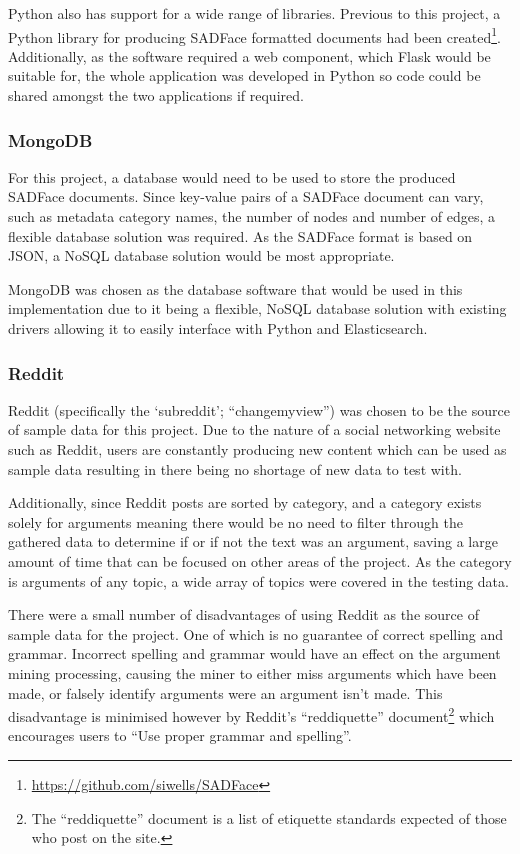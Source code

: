 \documentclass[12pt,a4paper]{article}
\begin{document}
Python also has support for a wide range of libraries. Previous to this project, a Python library for producing SADFace formatted documents had been created\footnote{\url{https://github.com/siwells/SADFace}}. Additionally, as the software required a web component, which Flask would be suitable for, the whole application was developed in Python so code could be shared amongst the two applications if required.

\subsubsection{MongoDB}

For this project, a database would need to be used to store the produced SADFace documents. Since key-value pairs of a SADFace document can vary, such as metadata category names, the number of nodes and number of edges, a flexible database solution was required. As the SADFace format is based on JSON, a NoSQL database solution would be most appropriate. 

MongoDB was chosen as the database software that would be used in this implementation due to it being a flexible, NoSQL database solution with existing drivers allowing it to easily interface with Python and Elasticsearch.

\subsubsection{Reddit}

Reddit (specifically the `subreddit'; ``changemyview'') was chosen to be the source of sample data for this project. Due to the nature of a social networking website such as Reddit, users are constantly producing new content which can be used as sample data resulting in there being no shortage of new data to test with.

Additionally, since Reddit posts are sorted by category, and a category exists solely for arguments meaning there would be no need to filter through the gathered data to determine if or if not the text was an argument, saving a large amount of time that can be focused on other areas of the project. As the category is arguments of any topic, a wide array of topics were covered in the testing data.

There were a small number of disadvantages of using Reddit as the source of sample data for the project. One of which is no guarantee of correct spelling and grammar.  Incorrect spelling and grammar would have an effect on the argument mining processing, causing the miner to either miss arguments which have been made, or falsely identify arguments were an argument isn't made. This disadvantage is minimised however by Reddit's ``reddiquette'' document\footnote{The ``reddiquette'' document is a list of etiquette standards expected of those who post on the site.} which encourages users to ``Use proper grammar and spelling''.
\end{document}

